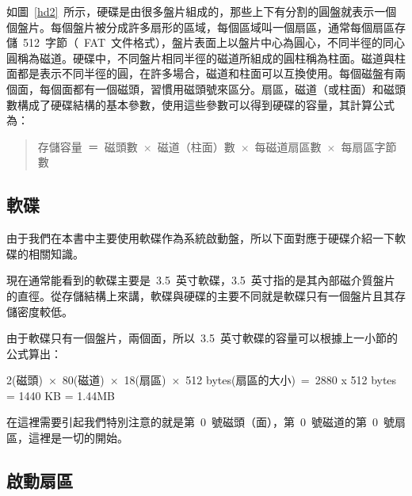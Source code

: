 如圖~\ref{hd2}~所示，硬碟是由很多盤片組成的，那些上下有分割的圓盤就表示一個個盤片。每個盤片被分成許多扇形的區域，每個區域叫一個扇區，通常每個扇區存儲~512~字節（~FAT~文件格式），盤片表面上以盤片中心為圓心，不同半徑的同心圓稱為磁道。硬碟中，不同盤片相同半徑的磁道所組成的圓柱稱為柱面。磁道與柱面都是表示不同半徑的圓，在許多場合，磁道和柱面可以互換使用。每個磁盤有兩個面，每個面都有一個磁頭，習慣用磁頭號來區分。扇區，磁道（或柱面）和磁頭數構成了硬碟結構的基本參數，使用這些參數可以得到硬碟的容量，其計算公式為：
\begin{quote}
存儲容量~＝~磁頭數~×~磁道（柱面）數~×~每磁道扇區數~×~每扇區字節數
\end{quote}


\subsection{軟碟}
由于我們在本書中主要使用軟碟作為系統啟動盤，所以下面對應于硬碟介紹一下軟碟的相關知識。


現在通常能看到的軟碟主要是~3.5~英寸軟碟，3.5~英寸指的是其內部磁介質盤片的直徑。從存儲結構上來講，軟碟與硬碟的主要不同就是軟碟只有一個盤片且其存儲密度較低。

由于軟碟只有一個盤片，兩個面，所以~3.5~英寸軟碟的容量可以根據上一小節的公式算出：

2(磁頭)~×~80(磁道)~×~18(扇區)~×~512 bytes(扇區的大小)~=~2880 x 512 bytes = 1440 KB = 1.44MB

在這裡需要引起我們特別注意的就是第~0~號磁頭（面），第~0~號磁道的第~0~號扇區，這裡是一切的開始。

\subsection{啟動扇區}

